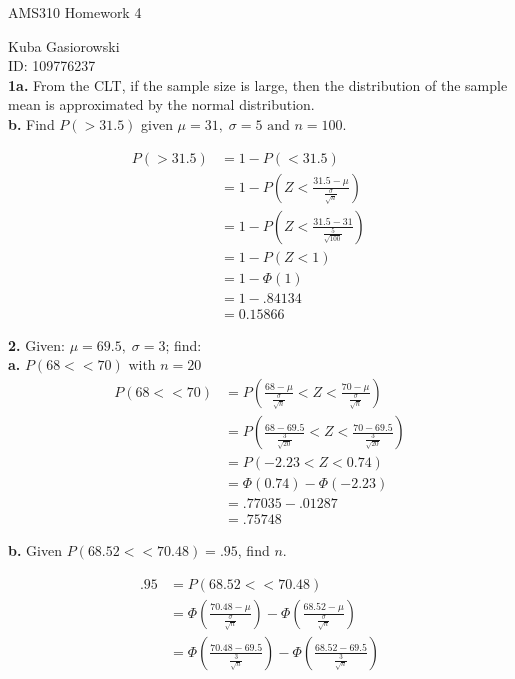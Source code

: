 \documentclass[12pt]{report}
\makeatletter
\newcommand*{\Xbar}{}%
\DeclareRobustCommand*{\Xbar}{%
	\mathpalette\@Xbar{}%
}
\newcommand*{\@Xbar}[2]{%
	\sbox0{$#1\mathrm{X}\m@th$}%
	\sbox2{$#1X\m@th$}%
	\rlap{%
		\hbox to\wd2{%
			\hfill
			$\overline{%
				\vrule width 0pt height\ht0 %
				\kern\wd0 %
			}$%
		}%
	}%
	\copy2 %
}
\makeatother
\begin{document}
\Large
\centering
AMS310 Homework 4

\justify
\normalsize

Kuba Gasiorowski\\
ID: 109776237\\

\noindent \textbf{1a.} From the CLT, if the sample size is large, then the distribution of the sample mean is approximated by the normal distribution.\\

\noindent \textbf{b.} Find $P(\Xbar > 31.5)$ given $\mu = 31,\;\sigma = 5 \text{ and } n = 100$.

\begin{align*}
	P(\Xbar > 31.5) &= 1 - P(\Xbar < 31.5)&&\\
	&= 1 - P\left(Z < \frac{31.5 - \mu}{\frac{\sigma}{\sqrt{n}}}\right)\\
	&= 1 - P\left(Z < \frac{31.5 - 31}{\frac{5}{\sqrt{100}}}\right)\\
	&= 1 - P(Z < 1)\\
	&= 1 - \Phi(1)\\
	&= 1 - .84134\\
	&= \boxed{0.15866}
\end{align*}

\noindent \textbf{2.} Given: $\mu=69.5, \; \sigma = 3$; find:\\

\noindent \textbf{a.} $P(68 < \Xbar < 70) \text{ with } n = 20$\\

\begin{align*}
	P(68 < \Xbar < 70) &= P\left(\frac{68 - \mu}{\frac{\sigma}{\sqrt{n}}} < Z < \frac{70 - \mu}{\frac{\sigma}{\sqrt{n}}}\right)\\
	&= P\left(\frac{68 - 69.5}{\frac{3}{\sqrt{20}}} < Z < \frac{70 - 69.5}{\frac{3}{\sqrt{20}}}\right)\\
	&= P(-2.23 < Z < 0.74)\\
	&= \Phi(0.74) - \Phi(-2.23)\\
	&= .77035 - .01287 \\
	&= \boxed{.75748}
\end{align*}

\noindent \textbf{b.} Given $P(68.52 < \Xbar < 70.48) = .95$, find $n$.

\begin{align*}
	.95 &= P(68.52 < \Xbar < 70.48)\\
	&= \Phi\left(\frac{70.48-\mu}{\frac{\sigma}{\sqrt{n}}}\right) - \Phi\left(\frac{68.52-\mu}{\frac{\sigma}{\sqrt{n}}}\right)\\
	&= \Phi\left(\frac{70.48 - 69.5}{\frac{3}{\sqrt{n}}}\right) - \Phi\left(\frac{68.52-69.5}{\frac{3}{\sqrt{n}}}\right)\\
\end{align*}
\end{document}
